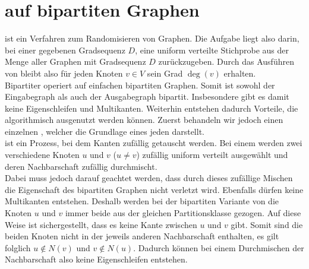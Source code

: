 
\section{\gc{} auf bipartiten Graphen}
\label{sec:global_curveball}
\gc{} ist ein Verfahren zum Randomisieren von Graphen.
Die Aufgabe liegt also darin, bei einer gegebenen Gradsequenz $D$, eine uniform verteilte Stichprobe
aus der Menge aller Graphen mit Gradsequenz $D$ zurückzugeben. Durch das Ausführen von \gc{} 
bleibt also für jeden Knoten $v\in V$ sein Grad $\deg(v)$ erhalten. 
\\

Bipartiter \gc{} operiert auf einfachen bipartiten Graphen. Somit ist sowohl der Eingabegraph als auch
der Ausgabegraph bipartit. Insbesondere gibt es damit keine Eigenschleifen und Multikanten.
Weiterhin entstehen dadurch 
Vorteile, die algorithmisch ausgenutzt werden können. Zuerst behandeln wir jedoch einen einzelnen \cb{}, welcher
die Grundlage eines jeden \gc{} darstellt.
\\

\fett{\cb{}} ist  ein Prozess, bei dem Kanten zufällig getauscht werden. Bei einem \ct{} werden
zwei verschiedene Knoten $u$ und $v$ ($u\neq v$) zufällig uniform verteilt ausgewählt und deren Nachbarschaft
zufällig durchmischt. 
\\

Dabei muss jedoch darauf geachtet werden, dass durch dieses zufällige Mischen die Eigenschaft
des bipartiten Graphen nicht verletzt wird. Ebenfalls dürfen keine Multikanten entstehen.
Deshalb werden bei der bipartiten Variante  von \cb{}
die Knoten $u$ und $v$ immer beide aus der gleichen Partitionsklasse gezogen.
Auf diese Weise ist sichergestellt, dass
es keine Kante zwischen $u$ und $v$ gibt. Somit sind die beiden Knoten nicht in der jeweils anderen Nachbarschaft
enthalten, es gilt folglich $u\notin N(v)$ und $v\notin N(u)$. Dadurch
können bei einem Durchmischen der Nachbarschaft also keine Eigenschleifen entstehen.
\\


